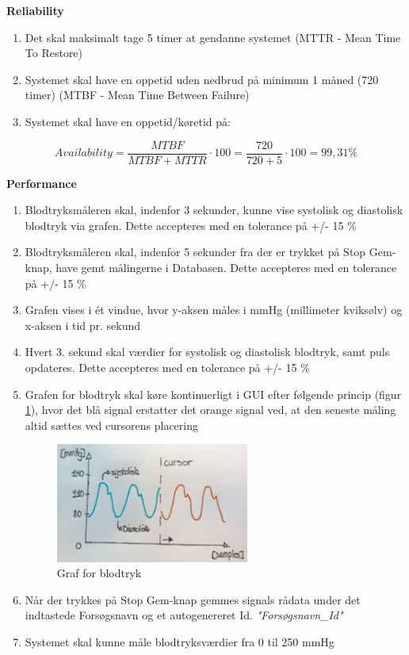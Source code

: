 \textbf{Reliability}
\begin{enumerate}
\item Det skal maksimalt tage 5 timer at gendanne systemet (MTTR - Mean Time To Restore)
\item Systemet skal have en oppetid uden nedbrud på minimum 1 måned (720 timer) (MTBF - Mean Time Between Failure)   
\item Systemet skal have en oppetid/køretid på: 
\end{enumerate}
\begin{ceqn}
\begin{equation}
Availability = \frac{MTBF}{MTBF+MTTR}\cdot100 = \frac{720}{720+5}\cdot100 = 99,31 \%
\end{equation}
\end{ceqn}
					
\textbf{Performance}
\begin{enumerate}
\item Blodtryksmåleren skal, indenfor 3 sekunder, kunne vise systolisk og diastolisk blodtryk via grafen. Dette accepteres med en tolerance på +/- 15 \%
\item Blodtryksmåleren skal, indenfor 5 sekunder fra der er trykket på Stop Gem-knap, have gemt målingerne i Databasen. Dette accepteres med en tolerance på +/- 15 \%
\item Grafen vises i ét vindue, hvor y-aksen måles i mmHg (millimeter kviksølv) og x-aksen i tid pr. sekund
\item Hvert 3. sekund skal værdier for systolisk og diastolisk blodtryk, samt puls opdateres. Dette accepteres med en tolerance på +/- 15 \%
\item Grafen for blodtryk skal køre kontinuerligt i GUI efter følgende princip (figur \ref{fig:Graf for blodtryks visning}), hvor det blå signal erstatter det orange signal ved, at den seneste måling altid sættes ved cursorens placering
\begin{figure}[H]
	\centering
	\includegraphics[width=0.6\textwidth]{Figurer/Cursor}
	\caption{Graf for blodtryk}
	\label{fig:Graf for blodtryks visning}
\end{figure}

\item Når der trykkes på Stop Gem-knap gemmes signals rådata under det indtastede Forsøgsnavn og et autogenereret Id. \textit{"Forsøgsnavn\_Id"}
\item Systemet skal kunne måle blodtryksværdier fra 0 til 250 mmHg
\end{enumerate}


